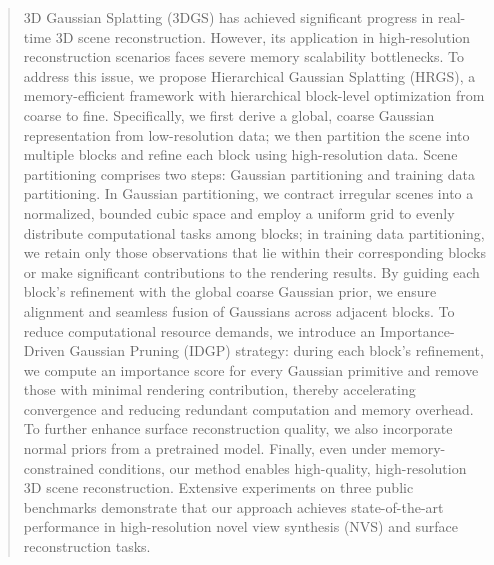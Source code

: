 \begin{abstract}
3D Gaussian Splatting (3DGS) has achieved significant progress in real-time 3D scene reconstruction. However, its application in high-resolution reconstruction scenarios faces severe memory scalability bottlenecks. To address this issue, we propose Hierarchical  Gaussian Splatting (HRGS), a memory-efficient framework with hierarchical block-level optimization from coarse to fine. Specifically, we first derive a global, coarse Gaussian representation from low-resolution data; we then partition the scene into multiple blocks and refine each block using high-resolution data. Scene partitioning comprises two steps: Gaussian partitioning and training data partitioning. In Gaussian partitioning, we contract irregular scenes into a normalized, bounded cubic space and employ a uniform grid to evenly distribute computational tasks among blocks; in training data partitioning, we retain only those observations that lie within their corresponding blocks or make significant contributions to the rendering results. By guiding each block’s refinement with the global coarse Gaussian prior, we ensure alignment and seamless fusion of Gaussians across adjacent blocks. To reduce computational resource demands, we introduce an Importance-Driven Gaussian Pruning (IDGP) strategy: during each block’s refinement, we compute an importance score for every Gaussian primitive and remove those with minimal rendering contribution, thereby accelerating convergence and reducing redundant computation and memory overhead. To further enhance surface reconstruction quality, we also incorporate normal priors from a pretrained model. Finally, even under memory-constrained conditions, our method enables high-quality, high-resolution 3D scene reconstruction. Extensive experiments on three public benchmarks demonstrate that our approach achieves state-of-the-art performance in high-resolution novel view synthesis (NVS) and surface reconstruction tasks.
\end{abstract}



